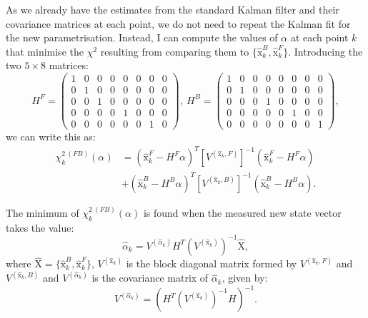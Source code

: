 As we already have the estimates from the standard Kalman filter and their covariance matrices at each point, we do not need to repeat the Kalman fit for the new parametrisation. Instead, I can compute the values of $\alpha$ at each point $k$ that minimise the $\chi^{2}$ resulting from comparing them to $\{\hat{\mathrm{x}}^{B}_{k}, \hat{\mathrm{x}}^{F}_{k}\}$. Introducing the two $5 \times 8$ matrices:
\begin{equation}
	H^{F}=\begin{pmatrix}1&0&0&0&0&0&0&0 \\ 0&1&0&0&0&0&0&0 \\ 0&0&1&0&0&0&0&0 \\ 0&0&0&0&1&0&0&0 \\ 0&0&0&0&0&0&1&0\end{pmatrix}, \
	H^{B}=\begin{pmatrix}1&0&0&0&0&0&0&0 \\ 0&1&0&0&0&0&0&0 \\ 0&0&0&1&0&0&0&0 \\ 0&0&0&0&0&1&0&0 \\ 0&0&0&0&0&0&0&1\end{pmatrix},
\end{equation}
we can write this as:
\begin{equation}
	\begin{split}
		\chi_{k}^{2 \ (FB)} (\alpha) &= (\hat{\mathrm{x}}_{k}^{F}-H^{F}\alpha)^{T}\left[V^{(\hat{\mathrm{x}}_{k},F)}\right]^{-1}(\hat{\mathrm{x}}_{k}^{F}-H^{F}\alpha)\\
		&+(\hat{\mathrm{x}}_{k}^{B}-H^{B}\alpha)^{T}\left[V^{(\hat{\mathrm{x}}_{k},B)}\right]^{-1}(\hat{\mathrm{x}}_{k}^{B}-H^{B}\alpha).
	\end{split}
\end{equation}

The minimum of $\chi_{k}^{2 \ (FB)} (\alpha)$ is found when the measured new state vector takes the value:
\begin{equation}
	\hat{\alpha}_{k} = V^{(\hat{\alpha}_{k})} H^{T} (V^{(\hat{\mathrm{x}}_{k})})^{-1} \hat{\mathrm{X}},
\end{equation}
where $\hat{\mathrm{X}} = \{\hat{\mathrm{x}}^{B}_{k}, \hat{\mathrm{x}}^{F}_{k}\}$, $V^{(\hat{\mathrm{x}}_{k})}$ is the block diagonal matrix formed by $V^{(\hat{\mathrm{x}}_{k},F)}$ and $V^{(\hat{\mathrm{x}}_{k},B)}$ and $V^{(\hat{\alpha}_{k})}$ is the covariance matrix of $\hat{\alpha}_{k}$, given by:
\begin{equation}
	V^{(\hat{\alpha}_{k})} = \left(H^{T} (V^{(\hat{\mathrm{x}}_{k})})^{-1} H\right)^{-1}.
\end{equation}

